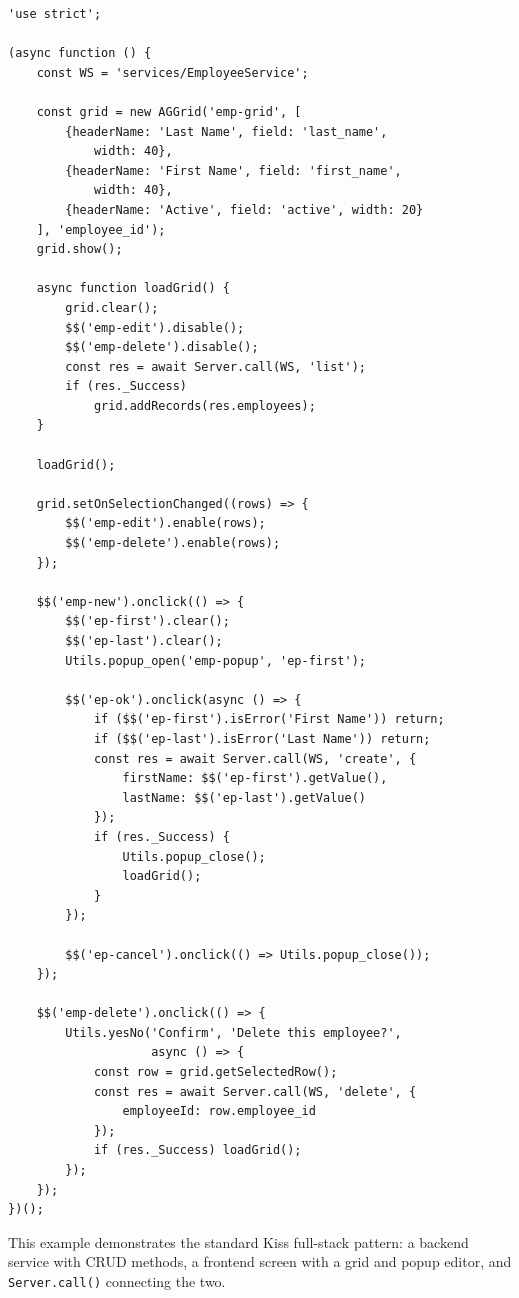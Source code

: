\begin{lstlisting}[style=javascript]
'use strict';

(async function () {
    const WS = 'services/EmployeeService';

    const grid = new AGGrid('emp-grid', [
        {headerName: 'Last Name', field: 'last_name',
            width: 40},
        {headerName: 'First Name', field: 'first_name',
            width: 40},
        {headerName: 'Active', field: 'active', width: 20}
    ], 'employee_id');
    grid.show();

    async function loadGrid() {
        grid.clear();
        $$('emp-edit').disable();
        $$('emp-delete').disable();
        const res = await Server.call(WS, 'list');
        if (res._Success)
            grid.addRecords(res.employees);
    }

    loadGrid();

    grid.setOnSelectionChanged((rows) => {
        $$('emp-edit').enable(rows);
        $$('emp-delete').enable(rows);
    });

    $$('emp-new').onclick(() => {
        $$('ep-first').clear();
        $$('ep-last').clear();
        Utils.popup_open('emp-popup', 'ep-first');

        $$('ep-ok').onclick(async () => {
            if ($$('ep-first').isError('First Name')) return;
            if ($$('ep-last').isError('Last Name')) return;
            const res = await Server.call(WS, 'create', {
                firstName: $$('ep-first').getValue(),
                lastName: $$('ep-last').getValue()
            });
            if (res._Success) {
                Utils.popup_close();
                loadGrid();
            }
        });

        $$('ep-cancel').onclick(() => Utils.popup_close());
    });

    $$('emp-delete').onclick(() => {
        Utils.yesNo('Confirm', 'Delete this employee?',
                    async () => {
            const row = grid.getSelectedRow();
            const res = await Server.call(WS, 'delete', {
                employeeId: row.employee_id
            });
            if (res._Success) loadGrid();
        });
    });
})();
\end{lstlisting}

\noindent
This example demonstrates the standard Kiss full-stack pattern: a backend service with CRUD methods, a frontend screen with a grid and popup editor, and \texttt{Server.call()} connecting the two.
